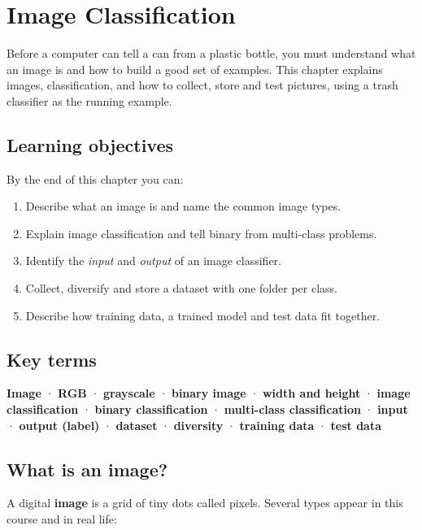 \chapter{Image Classification}

\begin{glancebox}
Before a computer can tell a can from a plastic bottle, you must understand what an image is and how to build a good set of examples. This chapter explains images, classification, and how to collect, store and test pictures, using a trash classifier as the running example.
\end{glancebox}

\section*{Learning objectives}

By the end of this chapter you can:


\begin{enumerate}
\item Describe what an image is and name the common image types.
\item Explain image classification and tell binary from multi-class problems.
\item Identify the \emph{input} and \emph{output} of an image classifier.
\item Collect, diversify and store a dataset with one folder per class.
\item Describe how training data, a trained model and test data fit together.
\end{enumerate}

\section*{Key terms}

\textbf{Image} · \textbf{RGB} · \textbf{grayscale} · \textbf{binary image} · \textbf{width and height} · \textbf{image classification} · \textbf{binary classification} · \textbf{multi-class classification} · \textbf{input} · \textbf{output (label)} · \textbf{dataset} · \textbf{diversity} · \textbf{training data} · \textbf{test data}


\section{What is an image?}

A digital \textbf{image} is a grid of tiny dots called pixels. Several types appear in this course and in real life:


